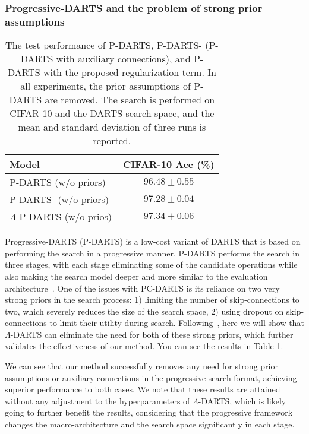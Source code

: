 \documentclass{article} \usepackage{fancyhdr, iclr2023_conference, times}
\newcommand{\mydarts}{$\Lambda$-DARTS\xspace}
\begin{document}
\subsubsection{Progressive-DARTS and the problem of strong prior assumptions}
\par \begin{table}[t]
\centering
\caption{The test performance of P-DARTS, P-DARTS- (P-DARTS with auxiliary connections), and P-DARTS with the proposed regularization term. In all experiments, the prior assumptions of P-DARTS are removed. The search is performed on CIFAR-10 and the DARTS search space, and the mean and standard deviation of three runs is reported.} 
\label{table:p-darts}
\begin{tabular}{l|c}
\textbf{Model} &\textbf{CIFAR-10 Acc (\%)} \\ \hline
    P-DARTS (w/o priors)~\citep{DBLP:journals/ijcv/ChenXWT21} & $96.48\pm 0.55$\\
    P-DARTS- (w/o priors)~\citep{DBLP:journals/ijcv/ChenXWT21} & $97.28\pm 0.04$\\\hline
    $\Lambda$-P-DARTS (w/o prios) & $\mathbf{97.34\pm 0.06}$
\end{tabular}
\end{table}Progressive-DARTS (P-DARTS) is a low-cost variant of DARTS that is based on performing the search in a progressive manner. P-DARTS performs the search in three stages, with each stage eliminating some of the candidate operations while also making the search model deeper and more similar to the evaluation architecture~\citep{DBLP:journals/ijcv/ChenXWT21}. One of the issues with PC-DARTS is its reliance on two very strong priors in the search process: 1) limiting the number of skip-connections to two, which severely reduces the size of the search space, 2) using dropout on skip-connections to limit their utility during search. Following~\citep{DBLP:conf/iclr/ChuW0LWY21}, here we will show that \mydarts can eliminate the need for both of these strong priors, which further validates the effectiveness of our method. You can see the results in Table-\ref{table:p-darts}.
\par We can see that our method successfully removes any need for strong prior assumptions or auxiliary connections in the progressive search format, achieving superior performance to both cases. We note that these results are attained without any adjustment to the hyperparameters of \mydarts, which is likely going to further benefit the results, considering that the progressive framework changes the macro-architecture and the search space significantly in each stage.
\end{document}
